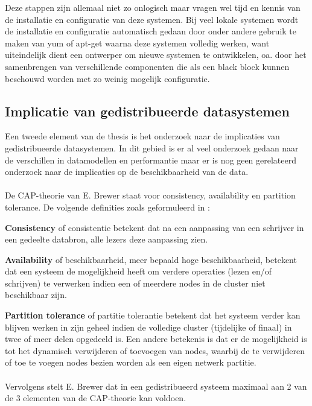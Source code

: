 Deze stappen zijn allemaal niet zo onlogisch maar vragen wel tijd en kennis van de installatie en configuratie van deze systemen. Bij veel lokale systemen wordt de installatie en configuratie automatisch gedaan door onder andere gebruik te maken van \gls{yum} of \gls{apt-get} waarna deze systemen volledig werken, want uiteindelijk dient een ontwerper om nieuwe systemen te ontwikkelen, oa. door het samenbrengen van verschillende componenten die als een black block kunnen beschouwd worden met zo weinig mogelijk configuratie. 

\subsection{Implicatie van gedistribueerde datasystemen}
Een tweede element van de thesis is het onderzoek naar de implicaties van gedistribueerde datasystemen. In dit gebied is er al veel onderzoek gedaan naar de verschillen in datamodellen en performantie maar er is nog geen gerelateerd onderzoek naar de implicaties op de beschikbaarheid van de data. 

\paragraph{}De CAP-theorie van E. Brewer\cite{Brewer:2000:TRD:343477.343502} staat voor consistency, availability en partition tolerance. De volgende definities zoals geformuleerd in \cite{Strauch.NoSQL}:


\textbf{Consistency} of consistentie betekent dat na een aanpassing van een schrijver in een gedeelte databron, alle lezers deze aanpassing zien. 

\textbf{Availability} of beschikbaarheid, meer bepaald hoge beschikbaarheid, betekent dat een systeem de mogelijkheid heeft om verdere operaties (lezen en/of schrijven) te verwerken indien een of meerdere nodes in de cluster niet beschikbaar zijn.

\textbf{Partition tolerance} of partitie tolerantie betekent dat het systeem verder kan blijven werken in zijn geheel indien de volledige cluster (tijdelijke of finaal) in twee of meer delen opgedeeld is. Een andere betekenis is dat er de mogelijkheid is tot het dynamisch verwijderen of toevoegen van nodes, waarbij de te verwijderen of toe te voegen nodes bezien worden als een eigen netwerk partitie. 

\paragraph{} Vervolgens stelt E. Brewer dat in een gedistribueerd systeem maximaal aan 2 van de 3 elementen van de CAP-theorie kan voldoen. 

